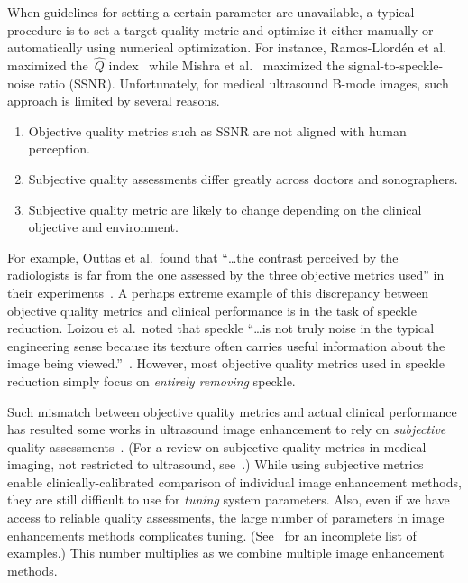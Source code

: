 When guidelines for setting a certain parameter are unavailable, a typical procedure is to set a target quality metric and optimize it either manually or automatically using numerical optimization.
For instance, Ramos-Llord\'en et al.~\cite{ramos-llorden_anisotropic_2015} maximized the~\(\widehat{Q}\) index~\cite{tay_ultrasound_2006} while Mishra et al.~\cite{mishra_edge_2018} maximized the signal-to-speckle-noise ratio (SSNR).
Unfortunately, for medical ultrasound B-mode images, such approach is limited by several reasons.
\vspace{0.05in}
\begin{enumerate}
  \item[\ding{228}] Objective quality metrics such as SSNR are not aligned with human perception.
    \vspace{0.05in}
  \item[\ding{228}] Subjective quality assessments differ greatly across doctors and sonographers.
    \vspace{0.05in}
  \item[\ding{228}] Subjective quality metric are likely to change depending on the clinical objective and environment.
\end{enumerate}
For example, Outtas et al.~found that ``\ldots the contrast perceived by the radiologists is far from the one assessed by the three objective metrics used'' in their experiments~\cite{outtas_subjective_2018}.
A perhaps extreme example of this discrepancy between objective quality metrics and clinical performance is in the task of speckle reduction.
Loizou et al.~noted that speckle ``\ldots is not truly noise in the typical engineering sense because its texture often carries useful information about the image being viewed.''~\cite{loizou_comparative_2005}.
However, most objective quality metrics used in speckle reduction simply focus on \textit{entirely removing} speckle.

Such mismatch between objective quality metrics and actual clinical performance has resulted some works in ultrasound image enhancement to rely on \textit{subjective} quality assessments~\cite{loizou_quality_2006, hemmsen_ultrasound_2010, wong_monte_2012, kang_new_2016, mishra_edge_2018}.
(For a review on subjective quality metrics in medical imaging, not restricted to ultrasound, see~\cite{chow_review_2016}.)
While using subjective metrics enable clinically-calibrated comparison of individual image enhancement methods, they are still difficult to use for \textit{tuning} system parameters.
Also, even if we have access to reliable quality assessments, the large number of parameters in image enhancements methods complicates tuning.
(See~\cite[Table 5]{finn_echocardiographic_2011} for an incomplete list of examples.)
This number multiplies as we combine multiple image enhancement methods.

